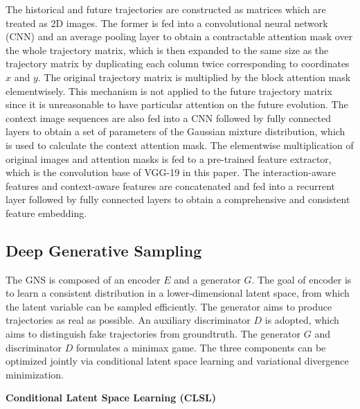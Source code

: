 \documentclass[letterpaper, 10 pt, conference]{ieeeconf}
\begin{document}
The historical and future trajectories are constructed as matrices which are treated as 2D images. The former is fed into a convolutional neural network (CNN) and an average pooling layer to obtain a contractable attention mask over the whole trajectory matrix, which is then expanded to the same size as the trajectory matrix by duplicating each column twice corresponding to coordinates $x$ and $y$. 
The original trajectory matrix is multiplied by the block attention mask elementwisely. This mechanism is not applied to the future trajectory matrix since it is unreasonable to have particular attention on the future evolution.
The context image sequences are also fed into a CNN followed by fully connected layers to obtain a set of parameters of the Gaussian mixture distribution, which is used to calculate the context attention mask. The elementwise multiplication of original images and attention masks is fed to a pre-trained feature extractor, which is the convolution base of VGG-19 \cite{vgg19} in this paper. The interaction-aware features and context-aware features are concatenated and fed into a recurrent layer followed by fully connected layers to obtain a comprehensive and consistent feature embedding.

\subsection{Deep Generative Sampling}
The GNS is composed of an encoder $E$ and a generator $G$. The goal of encoder is to learn a consistent distribution in a lower-dimensional latent space, from which the latent variable can be sampled efficiently. The generator aims to produce trajectories as real as possible. An auxiliary discriminator $D$ is adopted, which aims to distinguish fake trajectories from groundtruth.
The generator $G$ and discriminator $D$ formulates a minimax game. The three components can be optimized jointly via conditional latent space learning and variational divergence minimization.
\vspace{0.1cm}

\noindent
\textbf{Conditional Latent Space Learning (CLSL)}
\end{document}
